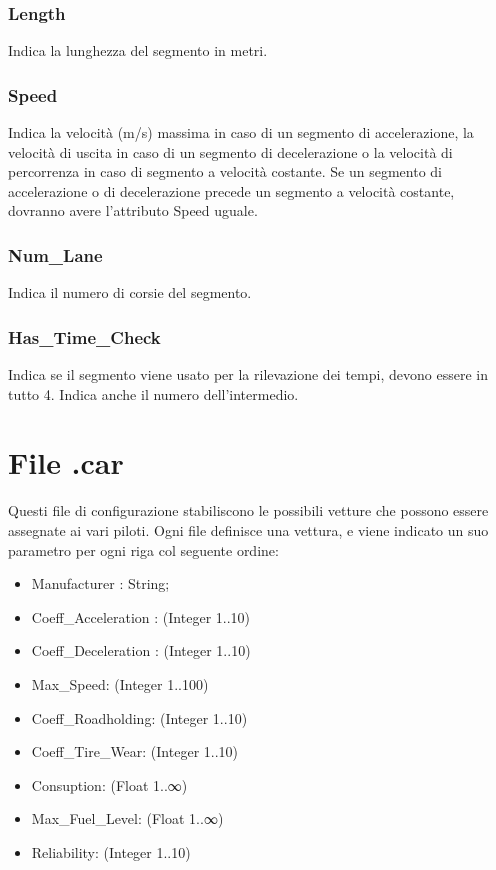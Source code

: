 \documentclass[a4paper,11pt, twoside]{book}
\begin{document}
	\subsubsection{Length}
	  Indica la lunghezza del segmento in metri.

	\subsubsection{Speed}
	  Indica la velocità (m/s) massima in caso di un segmento di accelerazione, la velocità di uscita in caso di 
	  un segmento di decelerazione o la velocità di percorrenza in caso di segmento a velocità costante.
	  Se un segmento di accelerazione o di decelerazione precede un segmento a velocità costante, dovranno avere l'attributo 
	  Speed uguale.

	\subsubsection{Num\_Lane}
	  Indica il numero di corsie del segmento.

	\subsubsection{Has\_Time\_Check}
	  Indica se il segmento viene usato per la rilevazione dei tempi, devono essere in tutto 4. 
	  Indica anche il numero dell'intermedio.
      
      \section{File .car}
	Questi file di configurazione stabiliscono le possibili vetture che possono essere assegnate ai vari piloti.
	Ogni file definisce una vettura, e viene indicato un suo parametro per ogni riga col seguente ordine:
	
	\begin{itemize}
	  \item Manufacturer : String;
	  \item Coeff\_Acceleration : (Integer 1..10)
	  \item Coeff\_Deceleration : (Integer 1..10)
	  \item Max\_Speed: (Integer 1..100)
	  \item Coeff\_Roadholding: (Integer 1..10)
	  \item Coeff\_Tire\_Wear: (Integer 1..10)
	  \item Consuption: (Float 1..∞)
	  \item Max\_Fuel\_Level: (Float 1..∞)
	  \item Reliability: (Integer 1..10)
	\end{itemize}
	
\end{document}
